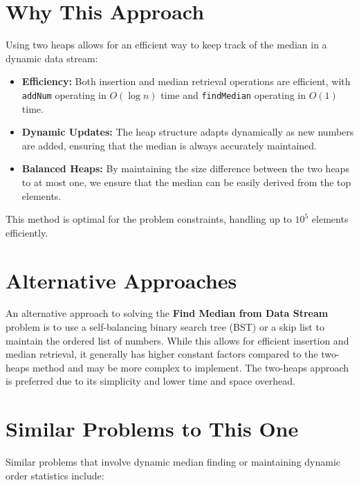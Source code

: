 \section*{Why This Approach}

Using two heaps allows for an efficient way to keep track of the median in a dynamic data stream:

\begin{itemize}
    \item \textbf{Efficiency:} Both insertion and median retrieval operations are efficient, with \texttt{addNum} operating in \(O(\log n)\) time and \texttt{findMedian} operating in \(O(1)\) time.
    
    \item \textbf{Dynamic Updates:} The heap structure adapts dynamically as new numbers are added, ensuring that the median is always accurately maintained.
    
    \item \textbf{Balanced Heaps:} By maintaining the size difference between the two heaps to at most one, we ensure that the median can be easily derived from the top elements.
\end{itemize}

This method is optimal for the problem constraints, handling up to \(10^5\) elements efficiently.

\section*{Alternative Approaches}

An alternative approach to solving the \textbf{Find Median from Data Stream} problem is to use a self-balancing binary search tree (BST) or a skip list to maintain the ordered list of numbers. While this allows for efficient insertion and median retrieval, it generally has higher constant factors compared to the two-heaps method and may be more complex to implement. The two-heaps approach is preferred due to its simplicity and lower time and space overhead.

\section*{Similar Problems to This One}

Similar problems that involve dynamic median finding or maintaining dynamic order statistics include:

